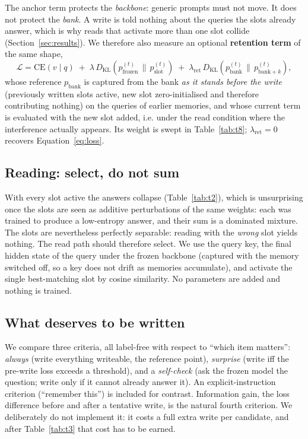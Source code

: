\documentclass[11pt]{article}
\begin{document}
The anchor term protects the \emph{backbone}: generic prompts must not move. It does
not protect the \emph{bank}. A write is told nothing about the queries the slots
already answer, which is why reads that activate more than one slot collide
(Section~\ref{sec:results}). We therefore also measure an optional \textbf{retention
term} of the same shape,
\begin{equation}
\mathcal{L} = \mathrm{CE}(v \mid q)
\; + \; \lambda \, D_{\mathrm{KL}}\!\left(p_{\text{frozen}}^{(t)} \,\|\,
p_{\text{slot}}^{(t)}\right)
\; + \; \lambda_{\mathrm{ret}} \, D_{\mathrm{KL}}\!\left(p_{\text{bank}}^{(t)}
\,\|\, p_{\text{bank}+k}^{(t)}\right),
\label{eq:retention}
\end{equation}
whose reference $p_{\text{bank}}$ is captured from the bank \emph{as it stands before the write} (previously written slots active, new slot zero-initialised and therefore contributing nothing) on the queries of earlier memories, and whose
current term is evaluated with the new slot added, i.e. under the read condition
where the interference actually appears. Its weight is swept in
Table~\ref{tab:t8}; $\lambda_{\mathrm{ret}} = 0$ recovers
Equation~\ref{eq:loss}.

\subsection{Reading: select, do not sum}
\label{sec:routing}

With every slot active the answers collapse (Table~\ref{tab:t2}), which is
unsurprising once the slots are seen as additive perturbations of the same
weights: each was trained to produce a low-entropy answer, and their sum is a
dominated mixture. The slots are nevertheless perfectly separable: reading with the \emph{wrong} slot yields nothing. The read path should therefore select.
We use the query key, the final hidden state of the query under the frozen
backbone (captured with the memory switched off, so a key does not drift as
memories accumulate), and activate the single best-matching slot by cosine
similarity. No parameters are added and nothing is trained.

\subsection{What deserves to be written}

We compare three criteria, all label-free with respect to ``which item matters'':
\emph{always} (write everything writeable, the reference point), \emph{surprise}
(write iff the pre-write loss exceeds a threshold), and a \emph{self-check}
(ask the frozen model the question; write only if it cannot already answer it).
An explicit-instruction criterion (``remember this'') is included for contrast.
Information gain, the loss difference before and after a tentative write, is the natural fourth criterion. We deliberately do not implement it: it costs a full extra write per candidate, and after Table~\ref{tab:t3} that cost has to be earned.
\end{document}
